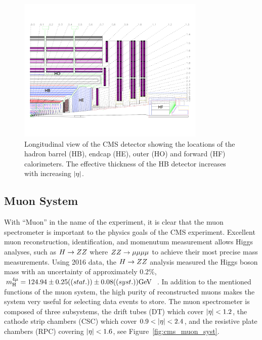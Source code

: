 \begin{figure}[htbp]
\centering
     \includegraphics[width=0.8\textwidth]{cms_and_lhc/plots/cms_hcal.pdf}
     \caption{
Longitudinal view of the CMS detector showing the locations of the hadron 
barrel (HB), endcap (HE), outer (HO) and forward (HF) calorimeters. The
effective thickness of the HB detector increases with increasing $\lvert\eta\rvert$.
     }
     \label{fig:cms_hcal}
\end{figure}




\subsection{Muon System}
With ``Muon'' in the name of the experiment, it is clear that the muon spectrometer
is important to the physics goals of the CMS experiment. Excellent muon reconstruction, 
identification, and momenutum measurement allows Higgs analyses, such as $H \to ZZ$
where $ZZ \to \mu\mu\mu\mu$ to achieve their most precise mass measurements. Using
2016 data, the $H \to ZZ$ analysis measured the Higgs boson mass with an uncertainty
of approximately 0.2\%, 
$m^{4\mu}_{\textrm{H}} = 124.94 \pm 0.25 ((stat.)) \pm 0.08 ((syst.))\mathrm{GeV}$~\cite{cms-2016-hzz}.
In addition to the mentioned functions of the muon system, the high purity of reconstructed
muons makes the system very useful for selecting data events to store.
The muon spectrometer is composed of three subsystems, the drift tubes (DT) which cover
$\lvert\eta\rvert < 1.2$, the cathode strip chambers (CSC) which cover $0.9 < \lvert\eta\rvert < 2.4$, and
the resistive plate chambers (RPC) covering $\lvert\eta\rvert < 1.6$, see Figure~\ref{fig:cms_muon_syst}.

